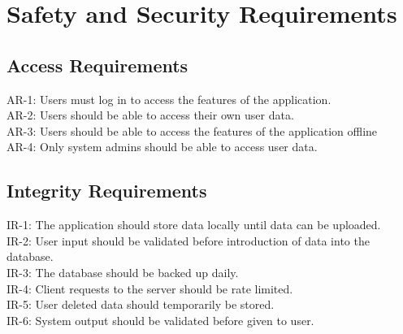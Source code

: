 \documentclass{article}
\begin{document}






\section{Safety and Security Requirements}

\subsection{Access Requirements}
AR-1: Users must log in to access the features of the application. \\
AR-2: Users should be able to access their own user data. \\ 
AR-3: Users should be able to access the features of the application offline\\
AR-4: Only system admins should be able to access user data. \\



\subsection{Integrity Requirements}
IR-1: The application should store data locally until data can be uploaded. \\
IR-2: User input should be validated before introduction of data into the database. \\
IR-3: The database should be backed up daily. \\
IR-4: Client requests to the server should be rate limited. \\
IR-5: User deleted data should temporarily be stored. \\
IR-6: System output should be validated before given to user. \\
\end{document}
